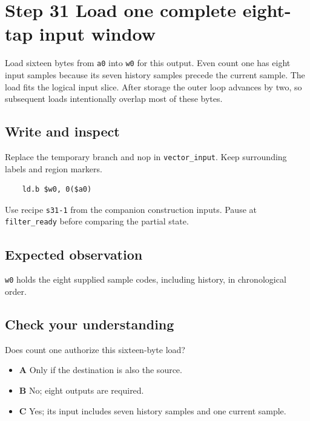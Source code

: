 \section{Step 31 Load one complete eight-tap input window}\label{fir-s31}

Load sixteen bytes from \texttt{a0} into \texttt{w0} for this output. Even count one has eight input samples because its seven history samples precede the current sample. The load fits the logical input slice. After storage the outer loop advances by two, so subsequent loads intentionally overlap most of these bytes.

\subsection{Write and inspect}
Replace the temporary branch and nop in \texttt{vector\_input}. Keep surrounding labels and region markers.

\begin{verbatim}
    ld.b $w0, 0($a0)
\end{verbatim}
Use recipe \texttt{s31-1} from the companion construction inputs. Pause at \texttt{filter\_ready} before comparing the partial state.

\subsection{Expected observation}
\texttt{w0} holds the eight supplied sample codes, including history, in chronological order.

\subsection{Check your understanding}
Does count one authorize this sixteen-byte load?

\begin{itemize}
\item \textbf{A} Only if the destination is also the source.
\item \textbf{B} No; eight outputs are required.
\item \textbf{C} Yes; its input includes seven history samples and one current sample.
\end{itemize}
